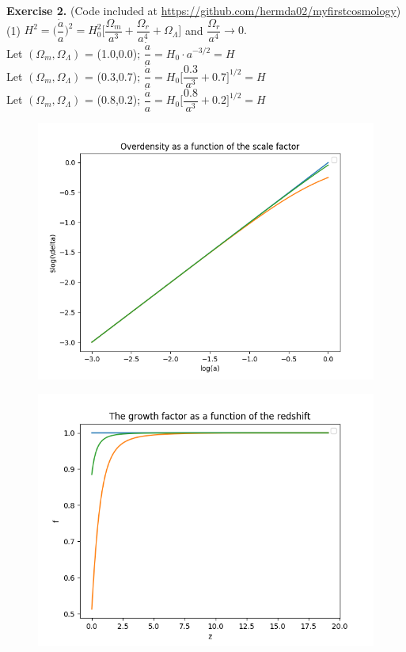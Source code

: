 \documentclass[a4paper]{article}
\begin{document}
\noindent \textbf{Exercise 2.} (Code included at \url{https://github.com/hermda02/myfirstcosmology}) \\
(1) $H^2 = \big( \dfrac{\dot{a}}{a} \big)^2 = H_0^2 \Big[\dfrac{\Omega_m}{a^3} + \dfrac{\Omega_r}{a^4}+\Omega_{\Lambda} \Big]$ and $\dfrac{\Omega_r}{a^4} \rightarrow 0.$\\
Let $(\Omega_m, \Omega_{\Lambda})$ = (1.0,0.0); $\dfrac{\dot{a}}{a} = H_0 \cdot a^{-3/2} = H$ \\
Let $(\Omega_m, \Omega_{\Lambda})$ = (0.3,0.7); $\dfrac{\dot{a}}{a} = H_0 \Big[\dfrac{0.3}{a^3} + 0.7 \Big]^{1/2} = H  $\\
Let $(\Omega_m, \Omega_{\Lambda})$ = (0.8,0.2); $\dfrac{\dot{a}}{a} = H_0 \Big[\dfrac{0.8}{a^3} + 0.2 \Big]^{1/2} = H $\\
\begin{figure}[h]
\centering
\includegraphics[scale=0.475]{exercise2-1}
\end{figure}
\begin{figure}[h]
\centering
\includegraphics[scale=0.475]{exercise2-2}
\end{figure}
\end{document}
